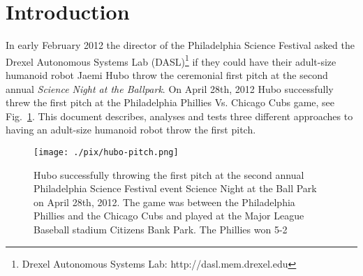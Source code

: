 \section{Introduction}
In early February 2012 the director of the Philadelphia Science Festival asked the Drexel Autonomous Systems Lab (DASL)\footnote{Drexel Autonomous Systems Lab: http://dasl.mem.drexel.edu}\label{foot:dasl} if they could have their adult-size humanoid robot Jaemi Hubo throw the ceremonial first pitch at the second annual \textit{Science Night at the Ballpark}.  On April 28th, 2012 Hubo successfully threw the first pitch at the Philadelphia Phillies Vs. Chicago Cubs game, see Fig.~\ref{fig:hubo-throw}.  This document describes, analyses and tests three different approaches to having an adult-size humanoid robot throw the first pitch.  

\begin{figure}[t]
  \centering
\texttt{[image: ./pix/hubo-pitch.png]}
  \caption{Hubo successfully throwing the first pitch at the second annual Philadelphia Science Festival event Science Night at the Ball Park on April 28th, 2012.  The game was between the Philadelphia Phillies and the Chicago Cubs and played at the Major League Baseball stadium Citizens Bank Park.  The Phillies won 5-2}
  \label{fig:hubo-throw}
\end{figure}


